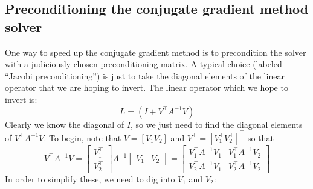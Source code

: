 \documentclass[reqno]{article}
\begin{document}
	\subsection{Preconditioning the conjugate gradient method solver}
	One way to speed up the conjugate gradient method is to precondition the solver with a judiciously chosen preconditioning matrix. A typical choice (labeled ``Jacobi preconditioning'') is just to take the diagonal elements of the linear operator that we are hoping to invert. The linear operator which we hope to invert is:
	\begin{equation}
		L = (I + V^\top A^{-1} V)
	\end{equation}
	Clearly we know the diagonal of $I$, so we just need to find the diagonal elements of $V^\top A^{-1} V$. To begin, note that $V = \left[ V_1 V_2 \right]$ and $V^\top = \left[ V_1^\top V_2^\top \right]^\top$ so that
	\begin{equation}
		V^\top A^{-1} V =
		\begin{bmatrix}
			V_1^\top \\
			V_2^\top
		\end{bmatrix}
		A^{-1}
		\begin{bmatrix}
			V_1 & V_2
		\end{bmatrix}
		= \begin{bmatrix}
			V_1^\top A^{-1} V_1 & V_1^\top A^{-1} V_2 \\
			V_2^\top A^{-1} V_1 & V_2^\top A^{-1} V_2
		\end{bmatrix}
	\end{equation}
	In order to simplify these, we need to dig into $V_1$ and $V_2$:
\end{document}
